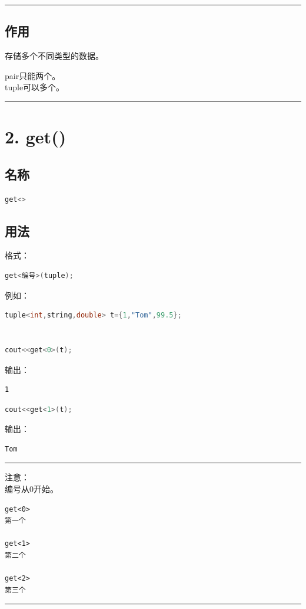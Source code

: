 \documentclass[9pt,twocolumn]{extarticle}
\begin{document}
\noindent\rule{\linewidth}{0.4pt}

\subsection{作用}
存储多个不同类型的数据。

pair只能两个。\\
tuple可以多个。

\noindent\rule{\linewidth}{0.4pt}

\section{2. get()}

\subsection{名称}
\begin{lstlisting}[language=C++]
get<>
\end{lstlisting}

\subsection{用法}
格式：
\begin{lstlisting}[language=C++]
get<编号>(tuple);
\end{lstlisting}
例如：
\begin{lstlisting}[language=C++]
tuple<int,string,double> t={1,"Tom",99.5};


cout<<get<0>(t);
\end{lstlisting}
输出：
\begin{lstlisting}
1
\end{lstlisting}

\begin{lstlisting}[language=C++]
cout<<get<1>(t);
\end{lstlisting}
输出：
\begin{lstlisting}
Tom
\end{lstlisting}

\noindent\rule{\linewidth}{0.4pt}

注意：\\
编号从0开始。
\begin{lstlisting}
get<0>
第一个

get<1>
第二个

get<2>
第三个
\end{lstlisting}

\noindent\rule{\linewidth}{0.4pt}
\end{document}
